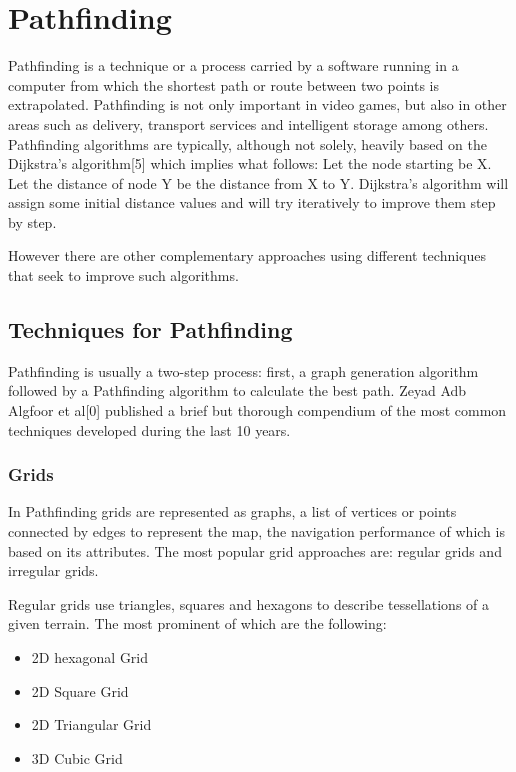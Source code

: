 \section{Pathfinding}

Pathfinding is a technique or a process carried by a software running in a computer from which the shortest path or route between two points is extrapolated. Pathfinding is not only important in video games, but also in other areas such as delivery, transport services and intelligent storage among others. Pathfinding algorithms are typically, although not solely, heavily based on the Dijkstra's algorithm[5] which implies what follows: Let the node starting be X. Let the distance of node Y be the distance from X to Y. Dijkstra's algorithm will assign some initial distance values and will try iteratively to improve them step by step.

\vspace{2mm}
However there are other complementary approaches using different techniques that seek to improve such algorithms.

\subsection{Techniques for Pathfinding}
Pathfinding is usually a two-step process: first, a graph generation algorithm followed by a Pathfinding algorithm to calculate the best path. Zeyad Adb Algfoor et al[0] published a brief but thorough compendium of the most common techniques developed during the last 10 years.


\subsubsection{Grids}
In Pathfinding grids are represented as graphs, a list of vertices or points connected by edges to represent the map, the navigation performance of which is based on its attributes. The most popular grid approaches are: regular grids and irregular grids.

\vspace{2mm}
Regular grids use triangles, squares and hexagons to describe tessellations of a given terrain. The most prominent of which are the following:

\begin{itemize}
	\item 2D hexagonal Grid
	\item 2D Square Grid
	\item 2D Triangular Grid
	\item 3D Cubic Grid
\end{itemize}

